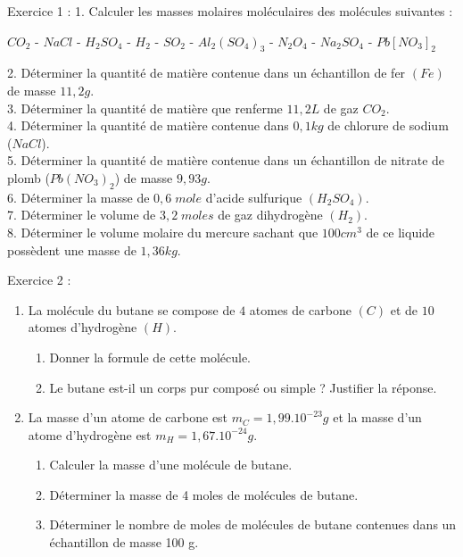 \documentclass[12pt, french]{article}
\begin{document}
\begin{center}
\end{center}


\begin{Box2}{Exercice 1 : }
1. Calculer les masses molaires moléculaires des molécules suivantes :
   \begin{center}
   $CO_2$ - $NaCl$ - $H_2SO_4$ - $H_2$ - $SO_2$ - $Al_2(SO_4)_3$ - $N_2O_4$ - $Na_2SO_4$ - $Pb[NO_3]_2$
   \end{center}
2. Déterminer la quantité de matière contenue dans un échantillon de fer $(Fe)$ de masse $11,2 g.$
\\3. Déterminer la quantité de matière que renferme $11,2 L$ de gaz $CO_2$.
\\4. Déterminer la quantité de matière contenue dans $0,1 kg$ de chlorure de sodium ($NaCl$).
\\5. Déterminer la quantité de matière contenue dans un échantillon de nitrate de plomb ($Pb(NO_3)_2$) de masse $9,93 g$.
\\6. Déterminer la masse de $0,6\; mole$ d’acide sulfurique $(H_2SO_4)$.
\\7. Déterminer le volume de $3,2\; moles$ de gaz dihydrogène $(H_2)$.
\\8. Déterminer le volume molaire du mercure sachant que $100 cm^3$ de ce liquide possèdent une masse de $1,36 kg.$
\end{Box2}

\begin{Box2}{Exercice 2 :}
   \begin{enumerate}
      \item La molécule du butane se compose de $4$ atomes de carbone $(C)$ et de $10$ atomes d’hydrogène $(H)$.
         \begin{enumerate}
               \item Donner la formule de cette molécule.
               \item Le butane est-il un corps pur composé ou simple ? Justifier la réponse.
         \end{enumerate}
      \item La masse d’un atome de carbone est $m_C = 1,99.10^{-23} g$ et la masse d’un atome d’hydrogène est $m_H=1,67.10^{-24}g.$
         \begin{enumerate}
               \item Calculer la masse d’une molécule de butane.
               \item Déterminer la masse de 4 moles de molécules de butane.
               \item Déterminer le nombre de moles de molécules de butane contenues dans un échantillon de masse 100 g.

         \end{enumerate}
   \end{enumerate}

\end{Box2}
\end{document}
